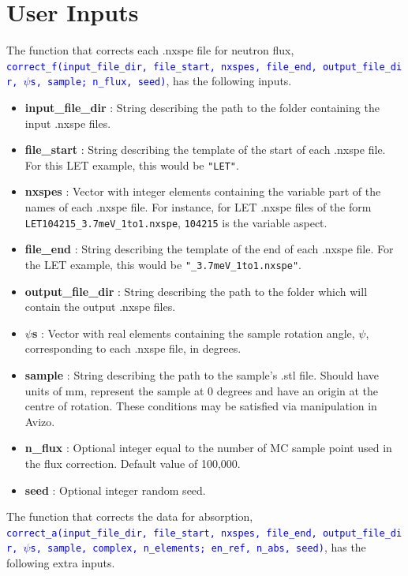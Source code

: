 \documentclass{article}
\begin{document}
\section{User Inputs}
The function that corrects each .nxspe file for neutron flux, \texttt{\textcolor{blue}{correct\_f(input\_file\_dir,\ file\_start,\ nxspes,\ file\_end,\ output\_file\_dir,\ $\psi$s,\ sample;\ n\_flux,\ seed)}}, has the following inputs. 
\begin{itemize}
    \item \textbf{input\_file\_dir} : String describing the path to the folder containing the input .nxspe files.
    \item \textbf{file\_start} : String describing the template of the start of each .nxspe file. For this LET example, this would be \verb!"LET"!.
    \item \textbf{nxspes} : Vector with integer elements containing the variable part of the names of each .nxspe file. For instance, for LET .nxspe files of the form \verb!LET104215_3.7meV_1to1.nxspe!, \verb!104215! is the variable aspect.
    \item \textbf{file\_end} : String describing the template of the end of each .nxspe file. For the LET example, this would be \verb!"_3.7meV_1to1.nxspe"!.
    \item \textbf{output\_file\_dir} : String describing the path to the folder which will contain the output .nxspe files.
    \item \textbf{$\psi$s} : Vector with real elements containing the sample rotation angle, $\psi$, corresponding to each .nxspe file, in degrees.
    \item \textbf{sample} : String describing the path to the sample's .stl file. Should have units of mm, represent the sample at 0 degrees and have an origin at the centre of rotation. These conditions may be satisfied via manipulation in Avizo.
    \item \textbf{n\_flux} : Optional integer equal to the number of MC sample point used in the flux correction. Default value of 100,000.
    \item \textbf{seed} : Optional integer random seed.\\
\end{itemize}
The function that corrects the data for absorption, \texttt{\textcolor{blue}{correct\_a(input\_file\_dir,\ file\_start,\ nxspes,\ file\_end,\ output\_file\_dir,\ $\psi$s,\ sample,\ complex,\ n\_elements;\ en\_ref,\ n\_abs,\ seed)}}, has the following extra inputs.
\end{document}
